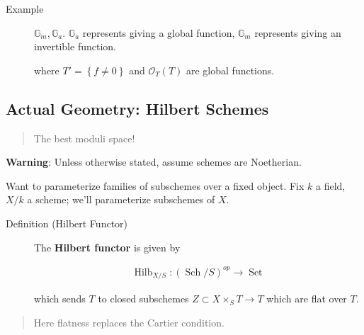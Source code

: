 \begin{description}
\item[Example]
\({\mathbb{G}}_m, {\mathbb{G}}_a\). \({\mathbb{G}}_a\) represents giving
a global function, \({\mathbb{G}}_m\) represents giving an invertible
function.

\begin{center}
\end{center}

where \(T' = \left\{{f\neq 0}\right\}\) and \({\mathcal{O}}_T(T)\) are
global functions.
\end{description}

\hypertarget{actual-geometry-hilbert-schemes}{%
\subsection{Actual Geometry: Hilbert
Schemes}\label{actual-geometry-hilbert-schemes}}

\begin{quote}
The best moduli space!
\end{quote}

\textbf{Warning}: Unless otherwise stated, assume schemes are
Noetherian.

Want to parameterize families of subschemes over a fixed object. Fix
\(k\) a field, \(X/k\) a scheme; we'll parameterize subschemes of \(X\).

\begin{description}
\item[Definition (Hilbert Functor)]
The \textbf{Hilbert functor} is given by

\begin{align*} \operatorname{Hilb}_{X/S}: ({\operatorname{Sch}}/S)^{op} \to {\operatorname{Set}} \end{align*}

which sends \(T\) to closed subschemes \(Z \subset X \times_S T \to T\)
which are flat over \(T\).
\end{description}

\begin{quote}
Here flatness replaces the Cartier condition.
\end{quote}

